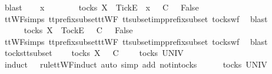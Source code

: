 \begin{isabellebody}
\ blast\isanewline
{}\isamarkupfalse%
\isanewline
\ \ \isamarkupfalse%
\ x\ {\isasymrho}\ {\isasymsigma}\isanewline
\ \ \isamarkupfalse%
\ {\isachardoublequoteopen}{\isasymsigma}\ {\isasymin}\ tocks\ X\ {\isasymLongrightarrow}\ {\isacharbrackleft}Tick{\isacharbrackright}\isactrlsub E\ {\isacharhash}\ x\ {\isacharhash}\ {\isasymrho}\ {\isasymsubseteq}\isactrlsub C\ {\isasymsigma}\ {\isasymLongrightarrow}\ False{\isachardoublequoteclose}\isanewline
\ \ \ \ \isamarkupfalse%
\ ttWF{\isachardot}simps{\isacharparenleft}{}{\isacharparenright}\ tt{\isacharunderscore}prefix{\isacharunderscore}subset{\isacharunderscore}ttWF\ tt{\isacharunderscore}subset{\isacharunderscore}imp{\isacharunderscore}prefix{\isacharunderscore}subset\ tocks{\isacharunderscore}wf\ \isamarkupfalse%
\ blast\isanewline
{}\isamarkupfalse%
\isanewline
\ \ \isamarkupfalse%
\ {\isasymrho}\ {\isasymsigma}\isanewline
\ \ \isamarkupfalse%
\ {\isachardoublequoteopen}{\isasymsigma}\ {\isasymin}\ tocks\ X\ {\isasymLongrightarrow}\ {\isacharbrackleft}Tock{\isacharbrackright}\isactrlsub E\ {\isacharhash}\ {\isasymrho}\ {\isasymsubseteq}\isactrlsub C\ {\isasymsigma}\ {\isasymLongrightarrow}\ False{\isachardoublequoteclose}\isanewline
\ \ \ \ \isamarkupfalse%
\ ttWF{\isachardot}simps{\isacharparenleft}{}{\isacharparenright}\ tt{\isacharunderscore}prefix{\isacharunderscore}subset{\isacharunderscore}ttWF\ tt{\isacharunderscore}subset{\isacharunderscore}imp{\isacharunderscore}prefix{\isacharunderscore}subset\ tocks{\isacharunderscore}wf\ \isamarkupfalse%
\ blast\isanewline
{}\isamarkupfalse%
%
\endisatagproof
{\isafoldproof}%
%
\isadelimproof
\isanewline
%
\endisadelimproof
\isanewline
{}\isamarkupfalse%
\ tocks{\isacharunderscore}tt{\isacharunderscore}subset{}{\isacharcolon}\isanewline
\ \ {\isachardoublequoteopen}{\isasymrho}\ {\isasymin}\ tocks\ X\ {\isasymLongrightarrow}\ {\isasymrho}\ {\isasymsubseteq}\isactrlsub C\ {\isasymsigma}\ {\isasymLongrightarrow}\ {\isasymsigma}\ {\isasymin}\ tocks\ UNIV{\isachardoublequoteclose}\isanewline
%
\isadelimproof
%
\endisadelimproof
%
\isatagproof
{}\isamarkupfalse%
\ {\isacharparenleft}induct\ {\isasymrho}\ {\isasymsigma}\ rule{\isacharcolon}ttWF{}{\isachardot}induct{\isacharcomma}\ auto\ simp\ add{\isacharcolon}\ notin{\isacharunderscore}tocks{\isacharparenright}\isanewline
\ \ \isamarkupfalse%
\ {\isachardoublequoteopen}{\isacharbrackleft}{\isacharbrackright}\ {\isasymin}\ tocks\ UNIV{\isachardoublequoteclose}\isanewline

\end{isabellebody}
